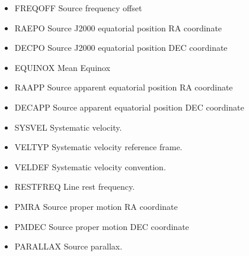 \documentclass[letterpaper,10pt,english]{sphinxmanual}
\begin{document}
\begin{fulllineitems}
\begin{itemize}
\item {} 
FREQOFF   Source frequency offset

\item {} 
RAEPO     Source J2000 equatorial position RA coordinate

\item {} 
DECPO     Source J2000 equatorial position DEC coordinate

\item {} 
EQUINOX   Mean Equinox

\item {} 
RAAPP     Source apparent equatorial position RA coordinate

\item {} 
DECAPP    Source apparent equatorial position DEC coordinate

\item {} 
SYSVEL    Systematic velocity.

\item {} 
VELTYP    Systematic velocity reference frame.

\item {} 
VELDEF    Systematic velocity convention.

\item {} 
RESTFREQ  Line rest frequency.

\item {} 
PMRA      Source proper motion RA coordinate

\item {} 
PMDEC     Source proper motion DEC coordinate

\item {} 
PARALLAX  Source parallax.

\end{itemize}

\end{fulllineitems}


\end{document}
